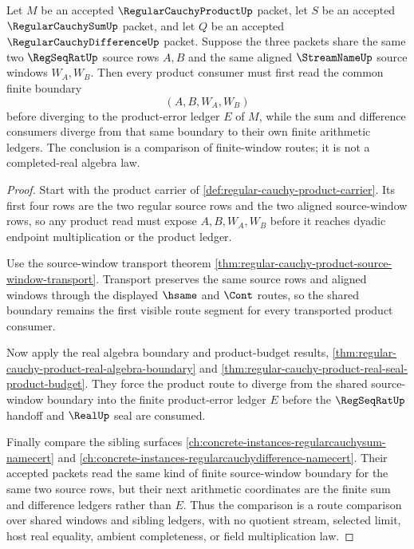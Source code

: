 \begin{theorem}
\label{thm:regular-cauchy-product-window-comparison}
Let $M$ be an accepted $\RegularCauchyProductUp$ packet, let $S$ be an accepted $\RegularCauchySumUp$ packet, and let $Q$ be an accepted $\RegularCauchyDifferenceUp$ packet. Suppose the three packets share the same two $\RegSeqRatUp$ source rows $A,B$ and the same aligned $\StreamNameUp$ source windows $W_A,W_B$. Then every product consumer must first read the common finite boundary
$$
(A,B,W_A,W_B)
$$
before diverging to the product-error ledger $E$ of $M$, while the sum and difference consumers diverge from that same boundary to their own finite arithmetic ledgers. The conclusion is a comparison of finite-window routes; it is not a completed-real algebra law.
\end{theorem}
\begin{proof}
Start with the product carrier of \autoref{def:regular-cauchy-product-carrier}. Its first four rows are the two regular source rows and the two aligned source-window rows, so any product read must expose $A,B,W_A,W_B$ before it reaches dyadic endpoint multiplication or the product ledger.

Use the source-window transport theorem \autoref{thm:regular-cauchy-product-source-window-transport}. Transport preserves the same source rows and aligned windows through the displayed $\hsame$ and $\Cont$ routes, so the shared boundary remains the first visible route segment for every transported product consumer.

Now apply the real algebra boundary and product-budget results, \autoref{thm:regular-cauchy-product-real-algebra-boundary} and \autoref{thm:regular-cauchy-product-real-seal-product-budget}. They force the product route to diverge from the shared source-window boundary into the finite product-error ledger $E$ before the $\RegSeqRatUp$ handoff and $\RealUp$ seal are consumed.

Finally compare the sibling surfaces \autoref{ch:concrete-instances-regularcauchysum-namecert} and \autoref{ch:concrete-instances-regularcauchydifference-namecert}. Their accepted packets read the same kind of finite source-window boundary for the same two source rows, but their next arithmetic coordinates are the finite sum and difference ledgers rather than $E$. Thus the comparison is a route comparison over shared windows and sibling ledgers, with no quotient stream, selected limit, host real equality, ambient completeness, or field multiplication law.
\end{proof}

